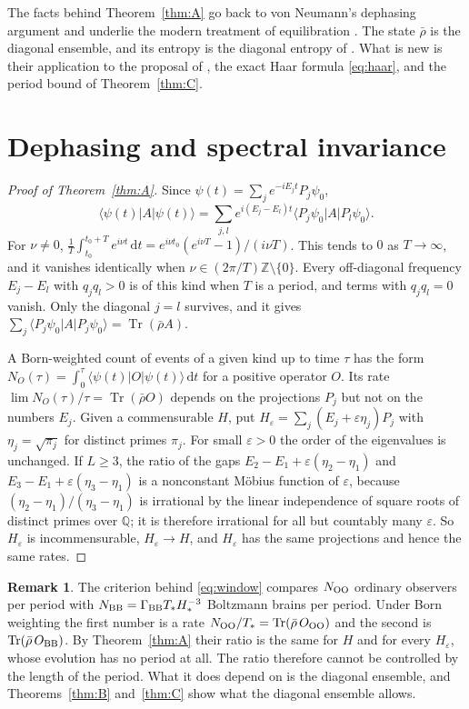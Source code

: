 \documentclass[11pt]{amsart}
\theoremstyle{definition}
\newtheorem{remark}[theorem]{Remark}
\newcommand{\ZZ}{\mathbb{Z}}
\newcommand{\dd}{\,\mathrm{d}}
\newcommand{\Tr}{\operatorname{Tr}}
\newcommand{\rb}{\bar\rho}
\begin{document}
The facts behind Theorem~\ref{thm:A} go back to von Neumann's dephasing argument \cite{vN29} and underlie the modern treatment of equilibration \cite{Rei08,LPSW09}. The state $\rb$ is the diagonal ensemble, and its entropy is the diagonal entropy of \cite{Pol11}. What is new is their application to the proposal of \cite{CDD26}, the exact Haar formula \eqref{eq:haar}, and the period bound of Theorem~\ref{thm:C}.

\section{Dephasing and spectral invariance}\label{sec:A}

\begin{proof}[Proof of Theorem~\ref{thm:A}]
Since $\psi(t)=\sum_je^{-iE_jt}P_j\psi_0$,
\[
\langle\psi(t)|A|\psi(t)\rangle=\sum_{j,l}e^{i(E_j-E_l)t}\langle P_j\psi_0|A|P_l\psi_0\rangle .
\]
For $\nu\neq0$, $\frac1T\int_{t_0}^{t_0+T}e^{i\nu t}\dd t=e^{i\nu t_0}(e^{i\nu T}-1)/(i\nu T)$. This tends to $0$ as $T\to\infty$, and it vanishes identically when $\nu\in(2\pi/T)\ZZ\setminus\{0\}$. Every off-diagonal frequency $E_j-E_l$ with $q_j q_l>0$ is of this kind when $T$ is a period, and terms with $q_jq_l=0$ vanish. Only the diagonal $j=l$ survives, and it gives $\sum_j\langle P_j\psi_0|A|P_j\psi_0\rangle=\Tr(\rb A)$.

A Born-weighted count of events of a given kind up to time $\tau$ has the form $N_O(\tau)=\int_0^\tau\langle\psi(t)|O|\psi(t)\rangle\dd t$ for a positive operator $O$. Its rate $\lim N_O(\tau)/\tau=\Tr(\rb O)$ depends on the projections $P_j$ but not on the numbers $E_j$. Given a commensurable $H$, put $H_\varepsilon=\sum_j(E_j+\varepsilon\eta_j)P_j$ with $\eta_j=\sqrt{\pi_j}$ for distinct primes $\pi_j$. For small $\varepsilon>0$ the order of the eigenvalues is unchanged. If $L\ge3$, the ratio of the gaps $E_2-E_1+\varepsilon(\eta_2-\eta_1)$ and $E_3-E_1+\varepsilon(\eta_3-\eta_1)$ is a nonconstant M\"obius function of $\varepsilon$, because $(\eta_2-\eta_1)/(\eta_3-\eta_1)$ is irrational by the linear independence of square roots of distinct primes over $\mathbb Q$; it is therefore irrational for all but countably many $\varepsilon$. So $H_\varepsilon$ is incommensurable, $H_\varepsilon\to H$, and $H_\varepsilon$ has the same projections and hence the same rates.
\end{proof}

\begin{remark}\label{rem:count}
The criterion behind \eqref{eq:window} compares $N_{\rm OO}$ ordinary observers per period with $N_{\rm BB}=\Gamma_{\rm BB}T_*H_*^{-3}$ Boltzmann brains per period. Under Born weighting the first number is a rate $N_{\rm OO}/T_*=\Tr(\rb\,O_{\rm OO})$ and the second is $\Tr(\rb\,O_{\rm BB})$. By Theorem~\ref{thm:A} their ratio is the same for $H$ and for every $H_\varepsilon$, whose evolution has no period at all. The ratio therefore cannot be controlled by the length of the period. What it does depend on is the diagonal ensemble, and Theorems~\ref{thm:B} and~\ref{thm:C} show what the diagonal ensemble allows.
\end{remark}
\end{document}
